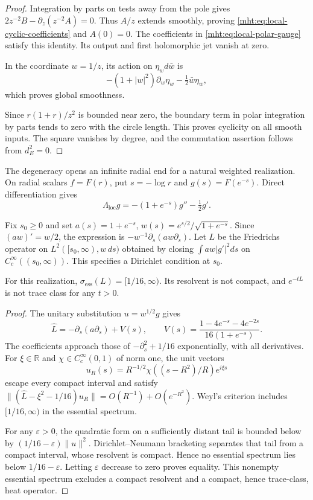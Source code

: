 \begin{proof}
Integration by parts on tests away from the pole gives
$2z^{-2}B-\partial_z(z^{-2}A)=0$. Thus $A/z$ extends smoothly,
proving \eqref{mht:eq:local-cyclic-coefficients} and $A(0)=0$.
The coefficients in \eqref{mht:eq:local-polar-gauge} satisfy this
identity. Its output and first holomorphic jet vanish at zero.

In the coordinate $w=1/z$, its action on $\eta_wd\bar w$ is
\[
 -(1+|w|^2)\partial_w\eta_w-\tfrac12\bar w\eta_w,
\]
which proves global smoothness.

Since $r(1+r)/z^2$ is bounded
near zero, the boundary term in polar integration by parts
tends to zero with the circle length. This proves cyclicity
on all smooth inputs. The square vanishes by degree, and the
commutation assertion follows from $d_E^2=0$.
\end{proof}

The degeneracy opens an infinite radial end for a natural
weighted realization. On radial scalars $f=F(r)$, put
$s=-\log r$ and $g(s)=F(e^{-s})$. Direct differentiation gives
\begin{equation}\label{mht:eq:local-radial-operator}
 \Lambda_{\mathrm{loc}}g=-(1+e^{-s})g''-\tfrac12g'.
\end{equation}

Fix $s_0\geq0$ and set
$a(s)=1+e^{-s}$, $w(s)=e^{s/2}/\sqrt{1+e^{-s}}$.
Since $(aw)'=w/2$, the expression is
$-w^{-1}\partial_s(aw\partial_s)$. Let $L$ be the Friedrichs
operator on $L^2([s_0,\infty),w\,ds)$ obtained by closing
$\int aw|g'|^2ds$ on $C_c^\infty((s_0,\infty))$.
This specifies a Dirichlet condition at $s_0$.

\begin{proposition}\label{mht:prop:local-radial-spectrum}
For this realization,
$\sigma_{\mathrm{ess}}(L)=[1/16,\infty)$. Its resolvent is
not compact, and $e^{-tL}$ is not trace class for any $t>0$.
\end{proposition}

\begin{proof}
The unitary substitution $u=w^{1/2}g$ gives
\[
 \widehat L=-\partial_s(a\partial_s)+V(s),\qquad
 V(s)=\frac{1-4e^{-s}-4e^{-2s}}{16(1+e^{-s})}.
\]
The coefficients approach those of $-\partial_s^2+1/16$
exponentially, with all derivatives. For $\xi\in\mathbb R$
and $\chi\in C_c^\infty(0,1)$ of norm one, the unit vectors
\[
 u_R(s)=R^{-1/2}\chi((s-R^2)/R)e^{i\xi s}
\]
escape every compact interval and satisfy
$\|(\widehat L-\xi^2-1/16)u_R\|=O(R^{-1})+O(e^{-R^2})$.
Weyl's criterion includes $[1/16,\infty)$ in the essential
spectrum.

For any $\varepsilon>0$, the quadratic form on a sufficiently
distant tail is bounded below by
$(1/16-\varepsilon)\|u\|^2$. Dirichlet--Neumann bracketing
separates that tail from a compact interval, whose resolvent
is compact. Hence no essential spectrum lies below
$1/16-\varepsilon$. Letting $\varepsilon$ decrease to zero
proves equality. This nonempty essential spectrum excludes
a compact resolvent and a compact, hence trace-class, heat
operator.
\end{proof}

